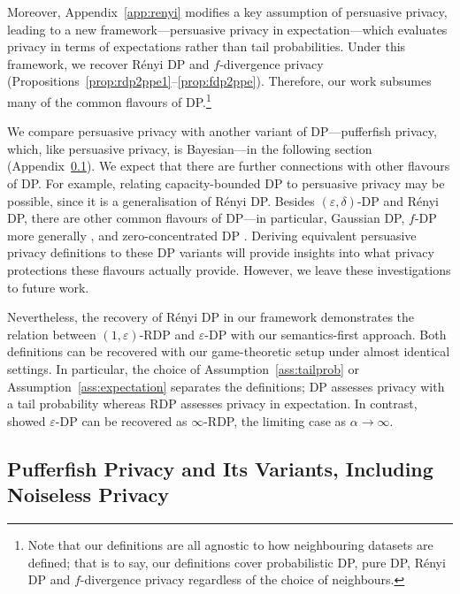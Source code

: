 \documentclass{article}
\theoremstyle{plain}
\theoremstyle{plain}
\theoremstyle{definition}
\theoremstyle{remark}
\theoremstyle{plain}
\renewcommand{\epsilon}{\varepsilon}
\begin{document}
Moreover, Appendix~\ref{app:renyi} modifies a key assumption of persuasive privacy, leading to a new framework---persuasive privacy in expectation---which evaluates privacy in terms of expectations rather than tail probabilities. Under this framework, we recover R\'enyi DP and $f$-divergence privacy (Propositions~\ref{prop:rdp2ppe1}--\ref{prop:fdp2ppe}). Therefore, our work subsumes many of the common flavours of DP.\footnote{Note that our definitions are all agnostic to how neighbouring datasets are defined; that is to say, our definitions cover probabilistic DP, pure DP, R\'enyi DP and $f$-divergence privacy regardless of the choice of neighbours.} 

We compare persuasive privacy with another variant of DP---pufferfish privacy, which, like persuasive privacy, is Bayesian---in the following section (Appendix~\ref{app:Pufferfish}). We expect that there are further connections with other flavours of DP. For example, relating capacity-bounded DP \citep{chaudhuriCapacityBoundedDifferential2019} to persuasive privacy may be possible, since it is a generalisation of R\'enyi DP.
Besides $(\epsilon, \delta)$-DP and R\'enyi DP, there are other common flavours of DP---in particular, Gaussian DP, $f$-DP more generally \citep{dongGaussianDifferentialPrivacy2022}, and zero-concentrated DP \citep{bunConcentratedDifferentialPrivacy2016}.
Deriving equivalent persuasive privacy definitions to these DP variants will provide insights into what privacy protections these flavours actually provide. However, we leave these investigations to future work. 

Nevertheless, the recovery of R\'{e}nyi DP in our framework demonstrates the relation between $(1,\epsilon)$-RDP and $\epsilon$-DP with our semantics-first approach. Both definitions can be recovered with our game-theoretic setup under almost identical settings. In particular, the choice of Assumption~\ref{ass:tailprob} or Assumption~\ref{ass:expectation} separates the definitions; DP assesses privacy with a tail probability whereas RDP assesses privacy in expectation. In contrast, \citet{mironov2017renyi} showed $\epsilon$-DP can be recovered as $\infty$-RDP, the limiting case as $\alpha\rightarrow\infty$.

\subsection{Pufferfish Privacy and Its Variants, Including Noiseless Privacy}\label{app:Pufferfish}
\end{document}
